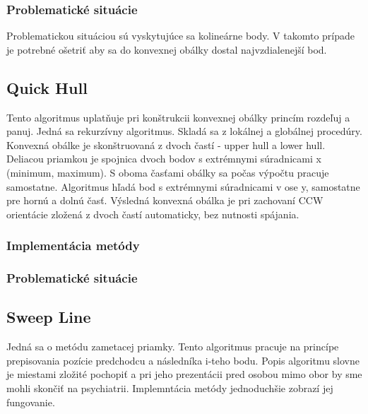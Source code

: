 \documentclass[12pt]{article}
\begin{document}
\subsubsection {Problematické situácie}
Problematickou situáciou sú vyskytujúce sa kolineárne body. V takomto prípade je potrebné ošetriť aby sa do konvexnej obálky dostal najvzdialenejší bod.

\subsection {Quick Hull}
Tento algoritmus uplatňuje pri konštrukcii konvexnej obálky princím rozdeľuj a panuj. Jedná sa rekurzívny algoritmus. Skladá sa z lokálnej a globálnej procedúry. Konvexná obálke je skonštruovaná z dvoch častí - upper hull a lower hull. Deliacou priamkou je spojnica dvoch bodov s extrémnymi súradnicami x (minimum, maximum). S oboma časťami obálky sa počas výpočtu pracuje samostatne. Algoritmus hľadá bod s extrémnymi súradnicami v ose y, samostatne pre hornú a dolnú časť. Výsledná konvexná obálka je pri zachovaní CCW orientácie zložená z dvoch častí automaticky, bez nutnosti spájania.

\subsubsection{Implementácia metódy}
\begin{enumerate}

\end{enumerate}
\subsubsection{Problematické situácie}

\subsection {Sweep Line}
Jedná sa o metódu zametacej priamky. Tento algoritmus pracuje na princípe prepisovania pozície predchodcu a následníka i-teho bodu. Popis algoritmu slovne je miestami zložité pochopiť a pri jeho prezentácii pred osobou mimo obor by sme mohli skončiť na psychiatrii. Implemntácia metódy jednoduchšie zobrazí jej fungovanie.
\end{document}
